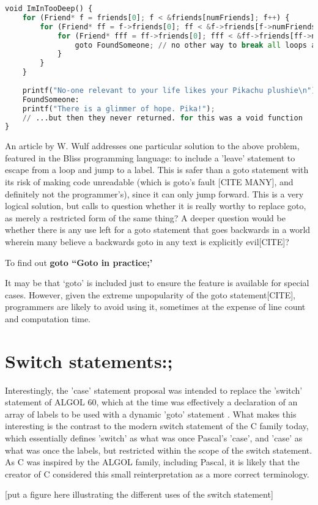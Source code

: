 \documentclass{journal}
\begin{document}
\begin{lstlisting}[language=Python,caption={An example of goto used for breaking loops (C)}]
void ImInTooDeep() {
	for (Friend* f = friends[0]; f < &friends[numFriends]; f++) {
		for (Friend* ff = f->friends[0]; ff < &f->friends[f->numFriends]; ff++) {
			for (Friend* fff = ff->friends[0]; fff < &ff->friends[ff->numFriends]; ff++) {
				goto FoundSomeone; // no other way to break all loops at once
			}
		}
	}
	
	printf("No-one relevant to your life likes your Pikachu plushie\n");
	FoundSomeone:
	printf("There is a glimmer of hope. Pika!");
	// ...but then they never returned. for this was a void function
}
\end{lstlisting}

An article by W. Wulf \cite{againstgoto} addresses one particular solution to the above problem, featured in the Bliss programming language: to include a 'leave' statement to escape from a loop and jump to a label. This is safer than a goto statement with its risk of making code unreadable (which is goto's fault [CITE MANY], and definitely not the programmer's), since it can only jump forward. This is a very logical solution, but calls to question whether it is really worthy to replace goto, as merely a restricted form of the same thing? A deeper question would be whether there is any use left for a goto statement that goes backwards in a world wherein many believe a backwards goto in any text is explicitly evil[CITE]?

To find out \textbf{goto ``Goto in practice;'}

It may be that `goto' is included just to ensure the feature is available for special cases. However, given the extreme unpopularity of the goto statement[CITE], programmers are likely to avoid using it, sometimes at the expense of line count and computation time.

\section{\textunderscore \textunderscore Switch statements:;}
Interestingly, the 'case' statement proposal was intended to replace the 'switch' statement of ALGOL 60, which at the time was effectively a declaration of an array of labels to be used with a dynamic 'goto' statement \cite{algolguide}. What makes this interesting is the contrast to the modern switch statement of the C family today, which essentially defines 'switch' as what was once Pascal's 'case', and 'case' as what was once the labels, but restricted within the scope of the switch statement. As C was inspired by the ALGOL family, including Pascal, it is likely that the creator of C considered this small reinterpretation as a more correct terminology.

[put a figure here illustrating the different uses of the switch statement]



\end{document}
